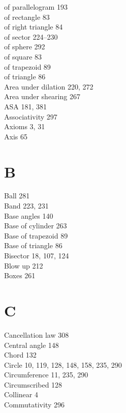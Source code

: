 \documentclass[12pt]{book} %
\begin{document}
\begin{ExerciseList}
\begin{ExerciseList}
\begin{ExerciseList}
\hspace*{1em}of parallelogram 193\\
\hspace*{1em}of rectangle 83\\
\hspace*{1em}of right triangle 84\\
\hspace*{1em}of sector 224--230\\
\hspace*{1em}of sphere 292\\
\hspace*{1em}of square 83\\
\hspace*{1em}of trapezoid 89\\
\hspace*{1em}of triangle 86\\
Area under dilation 220, 272\\
Area under shearing 267\\
ASA 181, 381\\
Associativity 297\\
Axioms 3, 31\\
Axis 65

\section*{B}
Ball 281\\
Band 223, 231\\
Base angles 140\\
Base of cylinder 263\\
Base of trapezoid 89\\
Base of triangle 86\\
Bisector 18, 107, 124\\
Blow up 212\\
Boxes 261

\section*{C}
Cancellation law 308\\
Central angle 148\\
Chord 132\\
Circle 10, 119, 128, 148, 158, 235, 290\\
Circumference 11, 235, 290\\
Circumscribed 128\\
Collinear 4\\
Commutativity 296\\


\end{ExerciseList}
\end{ExerciseList}
\end{ExerciseList}
\end{document}
